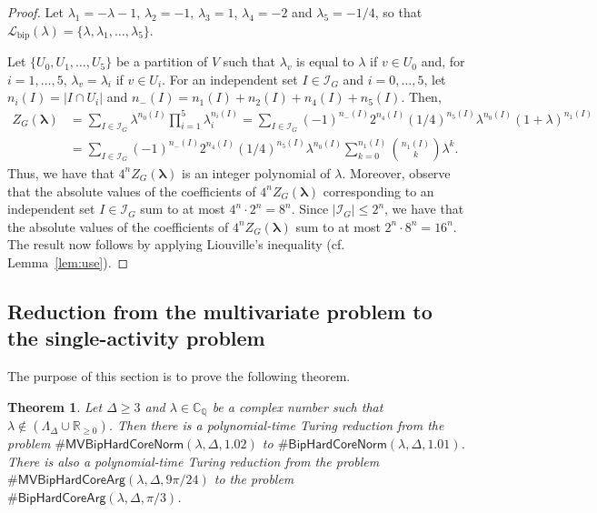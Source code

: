 \documentclass[11pt]{article}
\newtheorem{theorem}{Theorem}
\def\calI{\mathcal{I}}
\def\Reals{\mathbb{R}}
\def\CQ{\mathbb{C}_{\mathbb{Q}}}
\def\LambdaD{\Lambda_\Delta}
\def\Lbip{\mathcal{L}_{\mathrm{bip}}}
\def\lambdab{\ensuremath{\boldsymbol{\lambda}}}
\def\FactorHardCore#1{\#\ensuremath{\mathsf{BipHardCoreNorm}(\lambda,\Delta,#1)}}
\def\FactorMVBipHardCore#1{\#\ensuremath{\mathsf{MVBipHardCoreNorm}(\lambda,\Delta,#1)}}
\def\ArgHardCore#1{\#\ensuremath{\mathsf{BipHardCoreArg}(\lambda,\Delta,#1)}}
\def\ArgMVBipHardCore#1{\#\ensuremath{\mathsf{MVBipHardCoreArg}(\lambda,\Delta,#1)}}
\begin{document}
\begin{proof} 
Let $\lambda_1=-\lambda-1$, $\lambda_2=-1$, $\lambda_3=1$, $\lambda_4=-2$ and $\lambda_5=-1/4$, so that $\Lbip(\lambda)=\{\lambda,\lambda_1,\hdots,\lambda_5\}$.


Let $\{U_0,U_1,\hdots,U_5\}$ be a partition of $V$
such that $\lambda_v$ is equal to $\lambda$ if $v\in U_0$ and, for $i=1,\hdots,5$, $\lambda_v=\lambda_i$ if $v\in U_i$. For an independent set $I\in \calI_G$ and $i=0,\hdots,5$, let $n_i(I) = |I \cap U_i|$ and $n_{-}(I)=n_1(I)+n_2(I)+n_4(I)+n_5(I)$. Then,
\begin{align*}
Z_G(\lambdab)&= \sum_{I\in \calI_G} \lambda^{n_0(I)}\prod^5_{i=1}\lambda^{n_i(I)}_i=\sum_{I\in \calI_G} (-1)^{n_{-}(I)}2^{n_4(I)}(1/4)^{n_5(I)}\lambda^{n_0(I)}(1+\lambda)^{n_1(I)}\\
&=\sum_{I\in \calI_G} (-1)^{n_{-}(I)}2^{n_4(I)}(1/4)^{n_5(I)}\lambda^{n_0(I)}\sum^{n_1(I)}_{k=0}\binom{n_1(I)}{k}\lambda^k.
\end{align*}
Thus, we have that $4^n Z_G(\lambdab)$ is an integer  polynomial of $\lambda$. Moreover, observe that the absolute values of the coefficients of $4^n Z_G(\lambdab)$ corresponding to an independent set $I\in\calI_G$ sum  to at most $4^n\cdot 2^n=8^n$.   Since $|\calI_G | \leq 2^n$, we have that the absolute values of the coefficients of $4^n Z_G(\lambdab)$ sum to at most $2^n \cdot 8^n=16^n$. The result now follows by applying Liouville's inequality (cf. Lemma~\ref{lem:use}).
\end{proof}

 
\subsection{Reduction from the multivariate problem to the single-activity problem}\label{sec:MVtoSV}


 
 The purpose of this section is to prove the following theorem. 






\begin{theorem}\label{thm:MVtoSV}
Let $\Delta\geq 3$ and  
$\lambda\in \CQ$ be a complex number such that
$\lambda\not\in (\LambdaD \cup \Reals_{\geq 0})$. 
Then  
there is a polynomial-time Turing reduction
from the problem $\FactorMVBipHardCore{1.02}$ to
$\FactorHardCore{1.01}$.  
There is also a polynomial-time Turing reduction from the problem
$\ArgMVBipHardCore{9\pi/24}$ to the problem $\ArgHardCore{\pi/3}$.
\end{theorem}
 
\end{document}
